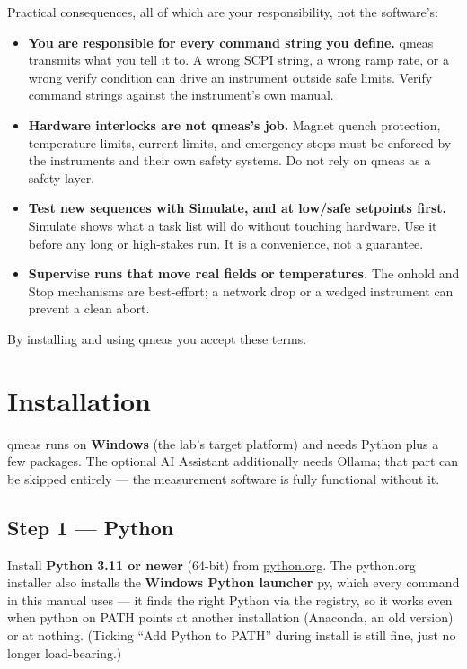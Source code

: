 \documentclass[11pt,a4paper]{article}
\newcommand{\code}[1]{{\ttfamily\color{qcode}#1}}
\begin{document}
Practical consequences, all of which are your responsibility, not the
software's:

\begin{itemize}
  \item \textbf{You are responsible for every command string you define.}
  qmeas transmits what you tell it to. A wrong SCPI string, a wrong ramp
  rate, or a wrong verify condition can drive an instrument outside safe
  limits. Verify command strings against the instrument's own manual.
  \item \textbf{Hardware interlocks are not qmeas's job.} Magnet quench
  protection, temperature limits, current limits, and emergency stops must
  be enforced by the instruments and their own safety systems. Do not rely
  on qmeas as a safety layer.
  \item \textbf{Test new sequences with Simulate, and at low/safe setpoints
  first.} Simulate shows what a task list will do without touching hardware.
  Use it before any long or high-stakes run. It is a convenience, not a
  guarantee.
  \item \textbf{Supervise runs that move real fields or temperatures.} The
  \code{onhold} and Stop mechanisms are best-effort; a network drop or a
  wedged instrument can prevent a clean abort.
\end{itemize}

By installing and using qmeas you accept these terms.

\section{Installation}

qmeas runs on \textbf{Windows} (the lab's target platform) and needs Python
plus a few packages. The optional AI Assistant additionally needs Ollama;
that part can be skipped entirely --- the measurement software is fully
functional without it.

\subsection{Step 1 --- Python}

Install \textbf{Python 3.11 or newer} (64-bit) from
\href{https://www.python.org/downloads/}{python.org}. The python.org
installer also installs the \textbf{Windows Python launcher} \code{py},
which every command in this manual uses --- it finds the right Python via
the registry, so it works even when \code{python} on PATH points at another
installation (Anaconda, an old version) or at nothing. (Ticking ``Add Python
to PATH'' during install is still fine, just no longer load-bearing.)
\end{document}
